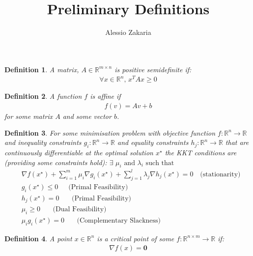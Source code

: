 \documentclass[a4paper,10pt]{article}
\date{}
\author{Alessio Zakaria}
\title{Preliminary Definitions\vspace{-30mm}}
\def\rnum{\mathbb{R}}
\newtheorem*{definition}{Definition}
\begin{document}
\maketitle
\begin{definition}
A matrix, $A \in \rnum^{m \times n}$ is positive semidefinite if:
\begin{align*}
    \forall     x \in \rnum^{n}, \, x^{T}Ax \geq 0
\end{align*}
\end{definition}
\begin{definition}
A function $f$ is affine if
\begin{align*}
    f(v) = Av + b
\end{align*} for some matrix $A$ and some vector $b$.
\end{definition}

\begin{definition}
    For some minimisation problem with objective function $f: \rnum^{n} \rightarrow \rnum$ and inequality
    constraints $g_{i}: \rnum^{n} \rightarrow \rnum$ and equality constraints
    $h_{j}: \rnum^{n} \rightarrow \rnum$ that are continuously differentiable at the optimal solution $x^{\star}$ the KKT conditions are (providing some constraints hold):
    $\exists \, \, \mu_{i} \text{ and }  \lambda_{i}\text{ such that}$
    \begin{align*}
        &\nabla f(x^{\star}) + \sum\limits_{i=1}^{m}\mu_{i} \nabla g_{i}(x^{\star}) + \sum\limits_{j=1}^{l}\lambda_{j}\nabla h_{j}(x^{\star}) = 0 \,\,\,\, \,\, \text{(stationarity)}\\
        &g_{i}(x^{\star}) \leq 0 \,\,\,\,\,\,\,\,\, \text{(Primal Feasibility)}\\
        &h_{j}(x^{\star}) = 0 \,\,\,\,\,\,\,\,\,\,\, \text{(Primal Feasibility)}\\
        &\mu_{i} \geq 0 \,\,\,\,\,\,\,\,\,\,\, \text{(Dual Feasibility)}\\
        &\mu_{i}g_{i}(x^{\star}) = 0 \,\,\,\,\,\,\,\,\,\,\, \text{(Complementary Slackness)}
    \end{align*}

    \label{a}
\end{definition}


\begin{definition}
    A point $x \in \rnum^{n}$ is a critical point of some $f : \rnum^{n \times m} \rightarrow \rnum$ if:
    \begin{align*}
        \nabla f(x) = \textbf{0}
    \end{align*}
    \label{<+label+>}
\end{definition}
\end{document}
